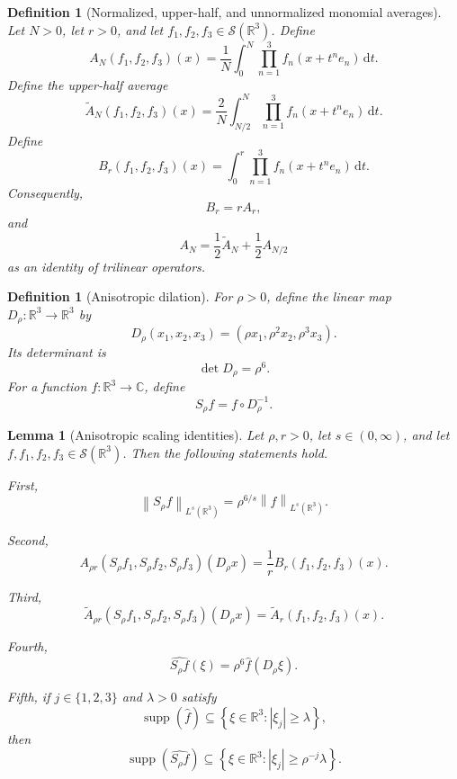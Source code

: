 \documentclass[11pt]{article}
\newtheorem{lemma}[theorem]{Lemma}
\newtheorem{definition}[theorem]{Definition}
\newcommand{\R}{\mathbb{R}}
\newcommand{\Cplx}{\mathbb{C}}
\newcommand{\Sch}{\mathcal{S}}
\newcommand{\supp}{\operatorname{supp}}
\newcommand{\dd}{\,\mathrm{d}}
\newcommand{\norm}[2]{\left\lVert #1\right\rVert_{#2}}
\newcommand{\abs}[1]{\left|#1\right|}
\newcommand{\set}[1]{\left\{#1\right\}}
\newcommand{\indices}{\{1,2,3\}}
\begin{document}
\begin{definition}[Normalized, upper-half, and unnormalized monomial averages]\label{def:averages}
Let \(N>0\), let \(r>0\), and let \(f_1,f_2,f_3\in\Sch(\R^3)\).  Define
\[
A_N(f_1,f_2,f_3)(x)
=
\frac1N\int_0^N\prod_{n=1}^{3}f_n(x+t^n e_n)\dd t.
\]
Define the upper-half average
\[
\widetilde A_N(f_1,f_2,f_3)(x)
=
\frac2N\int_{N/2}^{N}\prod_{n=1}^{3}f_n(x+t^n e_n)\dd t.
\]
Define
\[
B_r(f_1,f_2,f_3)(x)
=
\int_0^r\prod_{n=1}^{3}f_n(x+t^n e_n)\dd t.
\]
Consequently,
\[
B_r=rA_r,
\]
and
\[
A_N
=
\frac12\widetilde A_N+\frac12 A_{N/2}
\]
as an identity of trilinear operators.
\end{definition}

\begin{definition}[Anisotropic dilation]\label{def:dilation}
For \(\rho>0\), define the linear map \(D_\rho:\R^3\to\R^3\) by
\[
D_\rho(x_1,x_2,x_3)=(\rho x_1,\rho^2x_2,\rho^3x_3).
\]
Its determinant is
\[
\det D_\rho=\rho^6.
\]
For a function \(f:\R^3\to\Cplx\), define
\[
S_\rho f=f\circ D_\rho^{-1}.
\]
\end{definition}

\begin{lemma}[Anisotropic scaling identities]\label{lem:scaling}
Let \(\rho,r>0\), let \(s\in(0,\infty)\), and let \(f,f_1,f_2,f_3\in\Sch(\R^3)\).  Then the following statements hold.

First,
\[
\norm{S_\rho f}{L^s(\R^3)}=\rho^{6/s}\norm{f}{L^s(\R^3)}.
\]

Second,
\[
A_{\rho r}(S_\rho f_1,S_\rho f_2,S_\rho f_3)(D_\rho x)
=
\frac1r B_r(f_1,f_2,f_3)(x).
\]

Third,
\[
\widetilde A_{\rho r}(S_\rho f_1,S_\rho f_2,S_\rho f_3)(D_\rho x)
=
\widetilde A_r(f_1,f_2,f_3)(x).
\]

Fourth,
\[
\widehat{S_\rho f}(\xi)=\rho^6\widehat f(D_\rho\xi).
\]

Fifth, if \(j\in\indices\) and \(\lambda>0\) satisfy
\[
\supp(\widehat f)\subseteq\set{\xi\in\R^3:\abs{\xi_j}\geq\lambda},
\]
then
\[
\supp(\widehat{S_\rho f})
\subseteq
\set{\xi\in\R^3:\abs{\xi_j}\geq\rho^{-j}\lambda}.
\]
\end{lemma}
\end{document}
